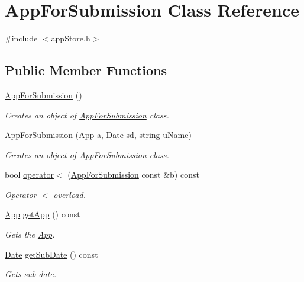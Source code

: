 \hypertarget{class_app_for_submission}{\section{App\-For\-Submission Class Reference}
\label{class_app_for_submission}
}


{\ttfamily \#include $<$app\-Store.\-h$>$}

\subsection*{Public Member Functions}
\begin{DoxyCompactItemize}
\item 
\hyperlink{class_app_for_submission_a5fae87af61b79da9e893ccf656af8e6b}{App\-For\-Submission} ()
\begin{DoxyCompactList}\small\item\em Creates an object of \hyperlink{class_app_for_submission}{App\-For\-Submission} class. \end{DoxyCompactList}\item 
\hyperlink{class_app_for_submission_a473949659cefa64245784f9a9d15ee9a}{App\-For\-Submission} (\hyperlink{class_app}{App} a, \hyperlink{struct_date}{Date} sd, string u\-Name)
\begin{DoxyCompactList}\small\item\em Creates an object of \hyperlink{class_app_for_submission}{App\-For\-Submission} class. \end{DoxyCompactList}\item 
bool \hyperlink{class_app_for_submission_aeec3c2f36afaad540b518f720083b946}{operator$<$} (\hyperlink{class_app_for_submission}{App\-For\-Submission} const \&b) const 
\begin{DoxyCompactList}\small\item\em Operator $<$ overload. \end{DoxyCompactList}\item 
\hyperlink{class_app}{App} \hyperlink{class_app_for_submission_a28d8e59fa04846c4418b2320f25c5bb7}{get\-App} () const 
\begin{DoxyCompactList}\small\item\em Gets the \hyperlink{class_app}{App}. \end{DoxyCompactList}\item 
\hyperlink{struct_date}{Date} \hyperlink{class_app_for_submission_ac58170a02a427f2e26273bbec0f6b5c3}{get\-Sub\-Date} () const 
\begin{DoxyCompactList}\small\item\em Gets sub date. \end{DoxyCompactList}\item 

\end{DoxyCompactItemize}

